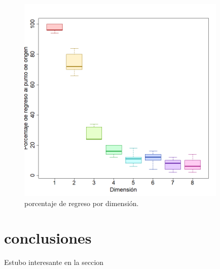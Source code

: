 \documentclass{article}
\begin{document}
\begin{figure}
  \begin{center}
    \includegraphics[width=10cm]{pr1sim.png}
  \end{center}
  \caption{porcentaje de regreso por dimensi\'on.}
  \label{fig:pr1sim.png}
\end{figure}

\section{conclusiones}\label{con}

Estubo interesante  en la seccion



\end{document}
